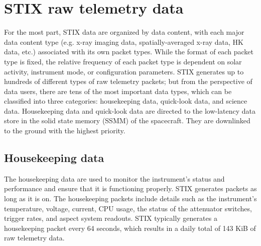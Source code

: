 \documentclass[referee]{aa} %
\begin{document}
\section{STIX raw telemetry data}
\label{sec:raw-data}
For the most part, STIX data are organized by data content, with each major data content
type (e.g. x-ray imaging data, spatially-averaged x-ray data, HK data, etc.) associated with
its own packet types. While the format of each packet type is fixed, the relative frequency of
each packet type is dependent on solar activity, instrument mode, or  configuration parameters. 
STIX generates up to hundreds of different types of raw telemetry packets; but from the perspective of data users, there are tens of the most important data types, which can be classified into three categories: housekeeping data, quick-look data, and science data.
Housekeeping data and quick-look data are directed to the low-latency data store in the solid state memory (SSMM) of the spacecraft. They are downlinked to the ground with the highest priority. 
\subsection{Housekeeping data}
 The housekeeping data are used to monitor the instrument's status and  performance and ensure that it is functioning properly.  STIX generates packets  as long as it is on. The housekeeping packets include details such as the instrument's temperature, voltage, current, CPU usage, the status of the attenuator switches, trigger rates,  and aspect system readouts. STIX typically generates a  housekeeping packet every 64 seconds,  which results in a daily total of 143 KiB of raw telemetry data.
\end{document}
